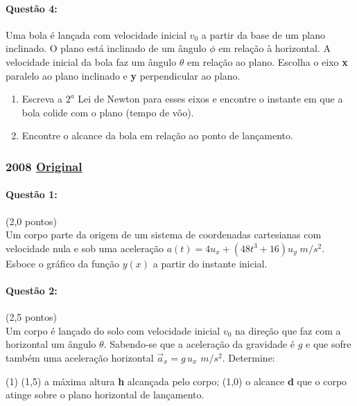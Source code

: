 \documentclass[12pt,a4paper]{article}
\newcommand{\original}[1]{\tiny \href{#1}{Original} \normalsize}
\begin{document}
\paragraph{Questão 4:}

Uma bola é lançada com velocidade inicial $v_0$ a partir da base de um plano inclinado. O plano está inclinado de um ângulo
$\phi$ em relação à horizontal. A velocidade inicial da bola faz um ângulo $\theta$ em relação ao plano. Escolha o eixo \textbf{x}
paralelo ao plano inclinado e \textbf{y} perpendicular ao plano.

\begin{enumerate}[label=\alph*)]
\item Escreva a $2^a$ Lei de Newton para esses eixos e encontre o instante em que a bola colide com o plano (tempo de vôo).
\item Encontre o alcance da bola em relação ao ponto de lançamento.
\end{enumerate}

\newpage

\subsubsection{2008 \original{https://drive.google.com/file/d/1G-n4jHDRWxaKT9PkMD1ck6IEqnf9I-p9/view?usp=sharing}} 

\paragraph{Questão 1:}(2,0 pontos)\\
Um corpo parte da origem de um sistema de coordenadas cartesianas com velocidade nula e sob uma aceleração $a(t)=4u_x+(48t^3+16)u_y\;m/s^2$. Esboce o gráfico da função $y(x)$ a partir do instante inicial.

\paragraph{Questão 2:}(2,5 pontos)\\
Um corpo é lançado do solo com velocidade inicial $v_0$ na direção que faz com a horizontal um ângulo $\theta$. Sabendo-se que a aceleração da gravidade é $g$ e que sofre também uma aceleração horizontal $\vec{a}_x=g\,u_x$ $m/s^2$. Determine:

\begin {tasks}(1)
\task (1,5) a máxima altura \textbf{h} alcançada pelo corpo;
\task (1,0) o alcance \textbf{d} que o corpo atinge sobre o plano horizontal de lançamento.
\end {tasks}
\end{document}
